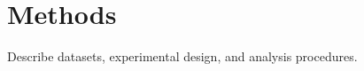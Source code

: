 \chapter{Methods}
\label{ch:methods}

Describe datasets, experimental design, and analysis procedures.
